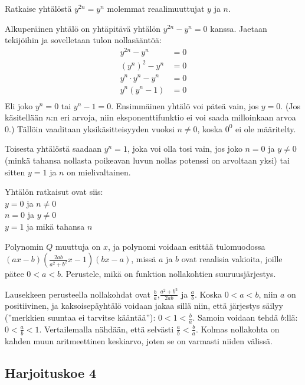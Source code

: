 \begin{tehtava}
Ratkaise yhtälöstä $y^{2n}=y^n$ molemmat reaalimuuttujat $y$ ja $n$.
	\begin{vastaus}
Alkuperäinen yhtälö on yhtäpitävä yhtälön $y^{2n}-y^n=0$ kanssa. Jaetaan tekijöihin ja sovelletaan tulon nollasääntöä:
	\begin{align*}
	y^{2n}-y^n&=0 \\
	(y^n)^2-y^n&=0 \\
	y^n \cdot y^n-y^n&=0 \\
	y^n(y^n-1)&=0\\
	\end{align*}
Eli joko $y^n=0$ tai $y^n-1=0$.	 Ensimmäinen yhtälö voi päteä vain, jos $y=0$. (Jos käsitellään $n$:n eri arvoja, niin eksponenttifunktio ei voi saada milloinkaan arvoa $0$.) Tällöin vaaditaan yksikäsitteisyyden vuoksi $n\neq0$, koska $0^0$ ei ole määritelty.

Toisesta yhtälöstä saadaan $y^n=1$, joka voi olla tosi vain, jos joko $n=0$ ja $y \neq 0$ (minkä tahansa nollasta poikeavan luvun nollas potenssi on arvoltaan yksi) tai sitten $y=1$ ja $n$ on mielivaltainen.

Yhtälön ratkaisut ovat siis: \\
$y=0$ ja $n \neq 0$ \\
$n=0$ ja $y \neq 0$ \\
$y=1$ ja mikä tahansa $n$
	\end{vastaus}
\end{tehtava}

\begin{tehtava}
Polynomin $Q$ muuttuja on $x$, ja polynomi voidaan esittää tulomuodossa $(ax-b)(\frac{2ab}{a^2+b^2}x-1)(bx-a)$, missä $a$ ja $b$ ovat reaalisia vakioita, joille pätee $0<a<b$. Perustele, mikä on funktion nollakohtien suuruusjärjestys.
		\begin{vastaus}
Lausekkeen perusteella nollakohdat ovat $\frac{b}{a}$,$\frac{a^2+b^2}{2ab}$ ja $\frac{a}{b}$. Koska $0<a<b$, niin $a$ on positiivinen, ja kaksoisepäyhtälö voidaan jakaa sillä niin, että järjestys säilyy (''merkkien suuntaa ei tarvitse kääntää''): $0<1<\frac{b}{a}$. Samoin voidaan tehdä $b$:llä: $0<\frac{a}{b}<1$. Vertailemalla nähdään, että selvästi $\frac{a}{b}<\frac{b}{a}$. Kolmas nollakohta on kahden muun aritmeettinen keskiarvo, joten se on varmasti niiden välissä.
		\end{vastaus}
\end{tehtava}
\newpage

\subsection*{Harjoituskoe 4}

